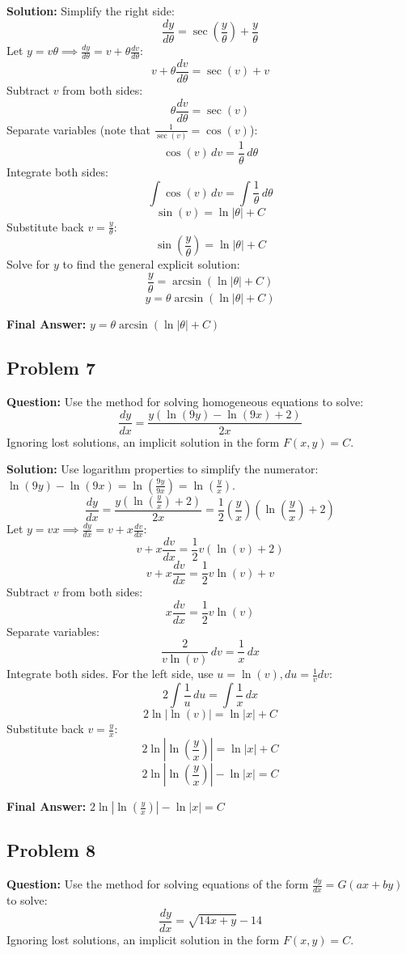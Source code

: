 \documentclass[11pt]{article}
\begin{document}
\textbf{Solution:}
Simplify the right side:
\[ \frac{dy}{d\theta} = \sec\left(\frac{y}{\theta}\right) + \frac{y}{\theta} \]
Let $y = v\theta \implies \frac{dy}{d\theta} = v + \theta\frac{dv}{d\theta}$:
\[ v + \theta\frac{dv}{d\theta} = \sec(v) + v \]
Subtract $v$ from both sides:
\[ \theta\frac{dv}{d\theta} = \sec(v) \]
Separate variables (note that $\frac{1}{\sec(v)} = \cos(v)$):
\[ \cos(v) \, dv = \frac{1}{\theta} \, d\theta \]
Integrate both sides:
\[ \int \cos(v) \, dv = \int \frac{1}{\theta} \, d\theta \]
\[ \sin(v) = \ln|\theta| + C \]
Substitute back $v = \frac{y}{\theta}$:
\[ \sin\left(\frac{y}{\theta}\right) = \ln|\theta| + C \]
Solve for $y$ to find the general explicit solution:
\[ \frac{y}{\theta} = \arcsin(\ln|\theta| + C) \]
\[ y = \theta \arcsin(\ln|\theta| + C) \]

\textbf{Final Answer:} $y = \theta \arcsin(\ln|\theta| + C)$

\vspace{0.5cm}
\subsection*{Problem 7}
\textbf{Question:} Use the method for solving homogeneous equations to solve:
\[ \frac{dy}{dx} = \frac{y(\ln(9y) - \ln(9x) + 2)}{2x} \]
Ignoring lost solutions, an implicit solution in the form $F(x,y) = C$.

\textbf{Solution:}
Use logarithm properties to simplify the numerator: $\ln(9y) - \ln(9x) = \ln\left(\frac{9y}{9x}\right) = \ln\left(\frac{y}{x}\right)$.
\[ \frac{dy}{dx} = \frac{y\left(\ln\left(\frac{y}{x}\right) + 2\right)}{2x} = \frac{1}{2}\left(\frac{y}{x}\right)\left(\ln\left(\frac{y}{x}\right) + 2\right) \]
Let $y = vx \implies \frac{dy}{dx} = v + x\frac{dv}{dx}$:
\[ v + x\frac{dv}{dx} = \frac{1}{2}v(\ln(v) + 2) \]
\[ v + x\frac{dv}{dx} = \frac{1}{2}v\ln(v) + v \]
Subtract $v$ from both sides:
\[ x\frac{dv}{dx} = \frac{1}{2}v\ln(v) \]
Separate variables:
\[ \frac{2}{v\ln(v)} \, dv = \frac{1}{x} \, dx \]
Integrate both sides. For the left side, use $u = \ln(v), du = \frac{1}{v} dv$:
\[ 2 \int \frac{1}{u} \, du = \int \frac{1}{x} \, dx \]
\[ 2\ln|\ln(v)| = \ln|x| + C \]
Substitute back $v = \frac{y}{x}$:
\[ 2\ln\left|\ln\left(\frac{y}{x}\right)\right| = \ln|x| + C \]
\[ 2\ln\left|\ln\left(\frac{y}{x}\right)\right| - \ln|x| = C \]

\textbf{Final Answer:} $2\ln\left|\ln\left(\frac{y}{x}\right)\right| - \ln|x| = C$

\vspace{0.5cm}
\subsection*{Problem 8}
\textbf{Question:} Use the method for solving equations of the form $\frac{dy}{dx} = G(ax+by)$ to solve:
\[ \frac{dy}{dx} = \sqrt{14x + y} - 14 \]
Ignoring lost solutions, an implicit solution in the form $F(x,y) = C$.
\end{document}
